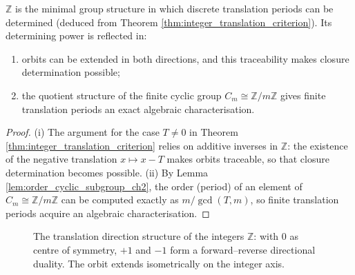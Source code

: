 \begin{corollary}\label{cor:integer_discrete_translation}
$\mathbb{Z}$ is the minimal group structure in which discrete translation periods can be determined (deduced from Theorem \ref{thm:integer_translation_criterion}). Its determining power is reflected in:
\begin{enumerate}[label=(\roman*)]
    \item orbits can be extended in both directions, and this traceability makes closure determination possible;
    \item the quotient structure of the finite cyclic group $C_m \cong \mathbb{Z}/m\mathbb{Z}$ gives finite translation periods an exact algebraic characterisation.
\end{enumerate}
\end{corollary}

\begin{proof}
(i) The argument for the case $T \neq 0$ in Theorem \ref{thm:integer_translation_criterion} relies on additive inverses in $\mathbb{Z}$: the existence of the negative translation $x \mapsto x - T$ makes orbits traceable, so that closure determination becomes possible.
(ii) By Lemma \ref{lem:order_cyclic_subgroup_ch2}, the order (period) of an element of $C_m \cong \mathbb{Z}/m\mathbb{Z}$ can be computed exactly as $m/\gcd(T,m)$, so finite translation periods acquire an algebraic characterisation.
\end{proof}

\begin{figure}[htbp]
\centering
{}
\caption{The translation direction structure of the integers $\mathbb{Z}$: with $0$ as centre of symmetry, $+1$ and $-1$ form a forward--reverse directional duality. The orbit extends isometrically on the integer axis.}
\label{fig:integer_direction}
\end{figure}
